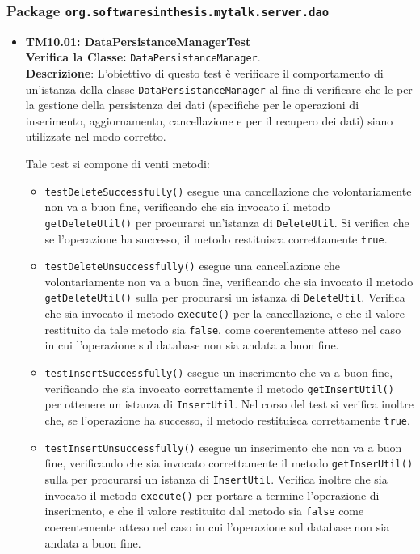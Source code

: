 \subsubsection{Package \texttt{org.softwaresinthesis.mytalk.server.dao}}
\begin{itemize}

\item \textbf{TM10.01: DataPersistanceManagerTest}\\
\textbf{Verifica la Classe:} \texttt{DataPersistanceManager}.\\
\textbf{Descrizione}: L'obiettivo di questo test è verificare il comportamento di un'istanza della classe \texttt{DataPersistanceManager} al fine di verificare che le  per la gestione della persistenza dei dati (specifiche per le operazioni di inserimento, aggiornamento, cancellazione e per il recupero dei dati) siano utilizzate nel modo corretto.

Tale test si compone di venti metodi:
\begin{itemize}

\item \texttt{testDeleteSuccessfully()} esegue una cancellazione che volontariamente non va a buon fine, verificando che sia invocato il metodo \texttt{getDeleteUtil()} per procurarsi un'istanza di \texttt{DeleteUtil}. Si verifica che se l'operazione ha successo, il metodo restituisca correttamente \texttt{true}.

\item \texttt{testDeleteUnsuccessfully()} esegue una cancellazione che volontariamente non va a buon fine, verificando che sia invocato il metodo \texttt{getDeleteUtil()} sulla  per procurarsi  un istanza di \texttt{DeleteUtil}. Verifica che sia invocato il metodo \texttt{execute()} per la cancellazione, e che il valore restituito da tale metodo sia \texttt{false}, come coerentemente atteso nel caso in cui l'operazione sul database non sia andata a buon fine.

\item \texttt{testInsertSuccessfully()} esegue un inserimento che va a buon fine, verificando che sia invocato correttamente il metodo \texttt{getInsertUtil()} per ottenere un istanza di \texttt{InsertUtil}. Nel corso del test si verifica inoltre che, se l'operazione ha successo, il metodo restituisca correttamente \texttt{true}.

\item \texttt{testInsertUnsuccessfully()} esegue un inserimento che non va a buon fine, verificando che sia invocato correttamente il metodo \texttt{getInserUtil()} sulla  per procurarsi un istanza di \texttt{InsertUtil}. Verifica inoltre che sia invocato il metodo \texttt{execute()} per portare a termine l'operazione di inserimento, e che il valore restituito dal metodo sia \texttt{false} come coerentemente atteso nel caso in cui l'operazione sul database non sia andata a buon fine.


\end{itemize}
\end{itemize}
